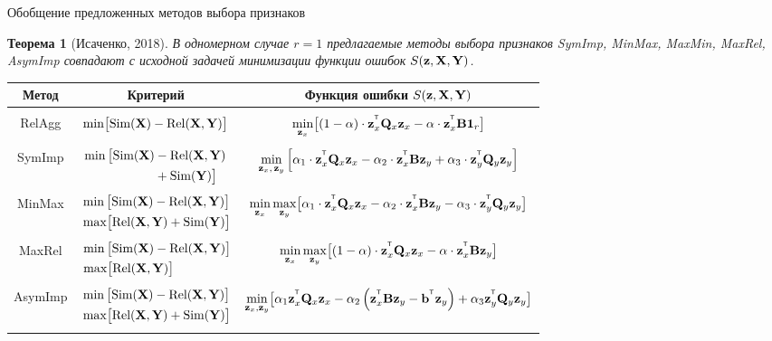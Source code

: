 \documentclass[10pt]{beamer}
\newtheorem{rustheorem}{Теорема}
\begin{document}
\begin{frame}{Обобщение предложенных методов выбора признаков}
	\begin{rustheorem}[Исаченко, 2018]
		В одномерном случае $r=1$ предлагаемые методы выбора признаков SymImp, MinMax, MaxMin, MaxRel, AsymImp совпадают с исходной задачей минимизации функции ошибок $S(\bz, \bX, \bY)$.
	\end{rustheorem}
	\vspace{-0.2cm}
	\begin{table}
		\centering
		\footnotesize{
			\begin{tabular}{c|c|c}
				\hline
				Метод & Критерий & Функция ошибки $S(\bz, \bX, \bY)$ \\
				\hline && \\ 
				RelAgg & $\min \bigl[ \text{Sim}(\bX) - \text{Rel}(\bX, \bY) \bigr] $ & $\min\limits_{\bz_x} \bigl[ (1 - \alpha) \cdot \bz_x^{\T} \bQ_x \bz_x - \alpha \cdot \bz_x^{\T} \bB \bOne_r \bigr] $ \\ &&\\
				SymImp & $\begin{aligned} \min \, \bigl[ \text{Sim}(\bX) & - \text{Rel}(\bX, \bY) \\ & + \text{Sim}(\bY) \bigr] \end{aligned}$ & $ \min\limits_{\bz_x, \, \bz_y} \left[ \alpha_1 \cdot \bz_x^{\T} \bQ_x \bz_x - \alpha_2 \cdot \bz_x^{\T} \bB \bz_y + \alpha_3 \cdot \bz_y^{\T} \bQ_y \bz_y \right] $\\ &&\\ 
				MinMax & $\begin{aligned} &\min \, \bigl[ \text{Sim}(\bX) - \text{Rel}(\bX, \bY) \bigr]  \\ & \max \bigl[\text{Rel}(\bX, \bY) + \text{Sim}(\bY) \bigr] \end{aligned}$ & $	\min\limits_{\bz_x} 	\max\limits_{\bz_y} \bigl[\alpha_1 \cdot \bz_x^{\T} \bQ_x \bz_x - \alpha_2 \cdot \bz_x^{\T} \bB \bz_y - \alpha_3 \cdot \bz_y^{\T} \bQ_y \bz_y \bigr]$ \\ &&\\ 
				MaxRel & $\begin{aligned} &\min \, \bigl[ \text{Sim}(\bX) - \text{Rel}(\bX, \bY) \bigr]  \\ & \max \bigl[\text{Rel}(\bX, \bY) \bigr] \end{aligned}$& $\min\limits_{\bz_x} 	\max\limits_{\bz_y} \bigl[ (1 - \alpha) \cdot \bz_x^{\T} \bQ_x \bz_x - \alpha \cdot \bz_x^{\T} \bB \bz_y \bigr]$ \\ 		&&\\
				AsymImp & $\begin{aligned} & \min \, \bigl[ \text{Sim}(\bX) - \text{Rel}(\bX, \bY) \bigr]\\ &  \max \bigl[\text{Rel}(\bX, \bY) + \text{Sim}(\bY) \bigr] \end{aligned}$ & $\min\limits_{\bz_x, \bz_y} \bigl[ \alpha_1 \bz_x^{\T} \bQ_x \bz_x - \alpha_2 \left(\bz_x^{\T} \bB \bz_y - \bb^{\T} \bz_y \right) + \alpha_3  \bz_y^{\T} \bQ_y \bz_y \bigr]$\\  && \\
				\hline
		\end{tabular}}
	\end{table}
\end{frame}
\end{document}
